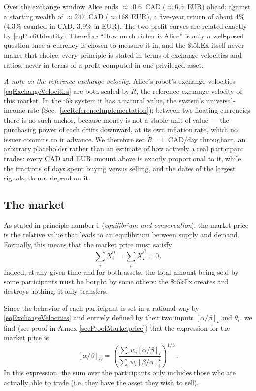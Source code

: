 \documentclass[letterpaper]{article}
\newcommand{\priceAB}{\left[\alpha / \beta\right]}
\newcommand{\priceBA}{\left[\beta / \alpha\right]}
\newcommand{\StokEx}{\$t\^{o}kEx}
\begin{document}
Over the exchange window Alice ends $\approx10.6$~CAD ($\approx6.5$~EUR) ahead: against a starting wealth of $\approx247$~CAD ($\approx168$~EUR), a five-year return of about 4\% (4.3\% counted in CAD, 3.9\% in EUR). The two profit curves are related exactly by \eqref{eqProfitIdentity}.
Therefore ``How much richer is Alice'' is only a well-posed question once a currency is chosen to measure it in, and the \StokEx{} itself never makes that choice: every principle is stated in terms of exchange velocities and ratios, never in terms of a profit computed in one privileged asset.

\emph{A note on the reference exchange velocity.} Alice's robot's exchange velocities \eqref{eqExchangeVelocities} are both scaled by $\dot{R}$, the reference exchange velocity of this market.
In the t\^{o}k system it has a natural value, the system's universal-income rate (Sec.~\ref{secReferenceImplementation}); between two floating currencies there is no such anchor, because money is not a stable unit of value ---
the purchasing power of each drifts downward, at its own inflation rate, which no issuer commits to in advance. We therefore set $\dot{R} = 1$~CAD/day throughout, an arbitrary placeholder rather than an estimate of how actively a real participant trades: every CAD and EUR amount above is exactly proportional to it,
while the fractions of days spent buying versus selling, and the dates of the largest signals, do not depend on it.

\subsection{The market}\label{secMarketPrice}

As stated in principle number 1 (\emph{equilibrium and conservation}), the market price is the relative value that leads to an equilibrium between supply and demand. Formally, this means that the market price must satisfy
\begin{equation}
    \sum_i \dot{X}_i^\alpha = \sum_i \dot{X}_i^\beta = 0 \,. \label{eqEquilibrium}
\end{equation}
Indeed, at any given time and for both assets, the total amount being sold by some participants must be bought by some others: the \StokEx{} creates and destroys nothing, it only transfers.

Since the behavior of each participant is set in a rational way by \eqref{eqExchangeVelocities} and entirely defined by their two inputs $\priceAB_i$ and $\theta_i$, we find (see proof in Annex \ref{secProofMarketprice}) that the expression for the market price is
\begin{equation}
    \priceAB_\Omega = \left( \frac{\displaystyle \sum_i w_i \priceAB_i}{\displaystyle \sum_i w_i \priceBA_i^2}\right)^{1/3}\,. \label{eqMarketPrice}
\end{equation}
In this expression, the sum over the participants only includes those who are actually able to trade (i.e. they have the asset they wish to sell).
\end{document}
